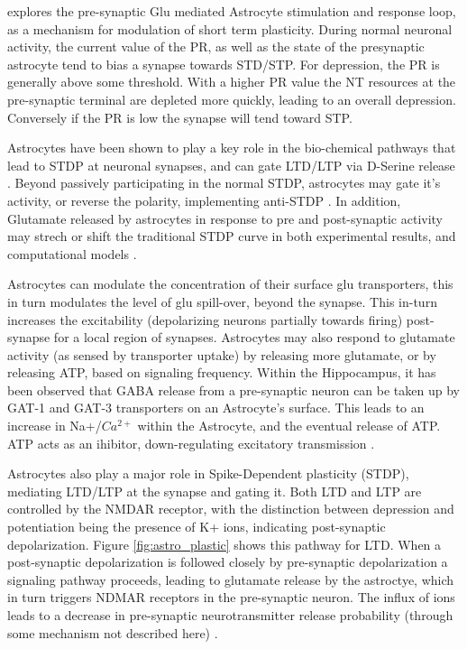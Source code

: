     \cite{pitta_2012} explores the pre-synaptic Glu mediated Astrocyte
    stimulation and response loop, as a mechanism for modulation of short term
    plasticity. During normal neuronal activity, the current value of the PR, as
    well as the state of the presynaptic astrocyte tend to bias a synapse
    towards STD/STP. For depression, the PR is generally above some
    threshold. With a higher PR value the NT resources at the pre-synaptic
    terminal are depleted more quickly, leading to an overall
    depression. Conversely if the PR is low the synapse will tend toward
    STP.

    Astrocytes have been shown to play a key role in the bio-chemical pathways
    that lead to STDP at neuronal synapses, and can gate LTD/LTP via D-Serine
    release \cite{manninen_2019}. Beyond passively participating in the normal
    STDP, astrocytes may gate it's activity, or reverse the polarity,
    implementing anti-STDP \cite{min_2012}. In addition, Glutamate released by
    astrocytes in response to pre and post-synaptic activity may strech or shift
    the traditional STDP curve in both experimental results, and computational
    models \cite{pitta_2016}.

    Astrocytes can modulate the concentration of their surface glu transporters,
    this in turn modulates the level of glu spill-over, beyond the synapse. This
    in-turn increases the excitability (depolarizing neurons partially towards
    firing) post-synapse for a local region of synapses. Astrocytes may also
    respond to glutamate activity (as sensed by transporter uptake) by releasing
    more glutamate, or by releasing ATP, based on signaling frequency. Within
    the Hippocampus, it has been observed that GABA release from a pre-synaptic
    neuron can be taken up by GAT-1 and GAT-3 transporters on an Astrocyte's
    surface. This leads to an increase in Na+/$Ca^{2+}$ within the Astrocyte,
    and the eventual release of ATP. ATP acts as an ihibitor, down-regulating
    excitatory transmission \cite{mederos_2018}.
    
    Astrocytes also play a major role in Spike-Dependent plasticity (STDP), mediating
    LTD/LTP at the synapse and gating it. Both LTD and LTP are controlled by the
    NMDAR receptor, with the distinction between depression and potentiation
    being the presence of K+ ions, indicating post-synaptic
    depolarization. Figure \ref{fig:astro_plastic} shows this pathway for
    LTD. When a post-synaptic depolarization is followed closely by pre-synaptic
    depolarization a signaling pathway proceeds, leading to glutamate release by
    the astroctye, which in turn triggers NDMAR receptors in the pre-synaptic
    neuron. The influx of ions leads to a decrease in pre-synaptic
    neurotransmitter release probability (through some mechanism not described
    here) \cite{min_2012}.
        
